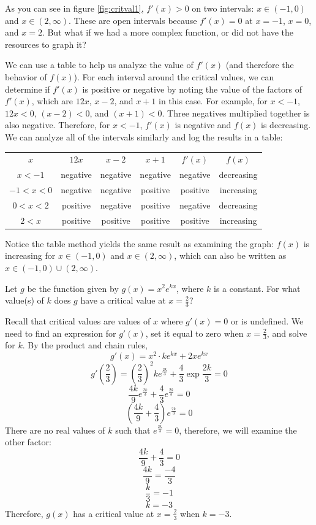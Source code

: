 \begin{Worked}
\begin{Solution}
As you can see in figure \ref{fig:critval1}, $f'(x)>0$ on two intervals: $x 
\in (-1, 0) $ and $x \in (2, \infty)$. These are open intervals because $f'(x) 
= 0$ at $x = -1$, $x = 0$, and $x = 2$. But what if we had a more complex 
function, or did not have the resources to graph it? 

We can use a table to help us analyze the value of $f'(x)$ (and therefore the behavior of $f(x)$). For 
each interval around the critical values, we can determine if $f'(x)$ is 
positive or negative by noting the value of the factors of $f'(x)$, which are 
$12x$, $x-2$, and $x+1$ in this case. For example, for $x < -1$, $12x < 0$, $(
x - 2) < 0$, and $(x + 1) < 0$. Three negatives multiplied together is also 
negative. Therefore, for $x<-1$, $f'(x)$ is negative and $f(x)$ is decreasing. 
We can analyze all of the intervals similarly and log the results in a table:


\begin{tabular}{c | c | c |c|c|c}
\hline
$x$ & $12x$ & $x-2$ & $x+1$ & $f'(x)$ & $f(x)$ \\
$x<-1$ & negative & negative & negative & negative &decreasing\\
$-1<x<0$ & negative & negative & positive & positive & increasing \\
$0<x<2$ & positive & negative & positive & negative & decreasing \\
$2<x$ & positive & positive & positive & positive & increasing\\
\end{tabular}


Notice the table method yields the same result as examining the graph: $f(x)$ 
is increasing for $x\in (-1, 0)$ and $x \in (2, \infty)$, which can also be 
written as $x \in (-1, 0) \cup (2, \infty)$. 
\end{Solution}
\end{Worked}


\begin{Exercise}[label=critval1]
	Let $g$ be the function given by $g(x) = x^2e^{kx}$, where $k$ is a constant. 
	For what value(s) of $k$ does $g$ have a critical value at $x=\frac{2}{3}$?
\end{Exercise}

\begin{Answer}[ref=critval1]
	Recall that critical values are values of $x$ where $g'(x) =0$ or is 
	undefined. We need to find an expression for $g'(x)$, set it equal to zero 
	when $x=\frac{2}{3}$, and solve for $k$. 
	By the product and chain rules,
	$$g'(x) = x^2 \cdot ke^{kx} + 2xe^{kx}$$
	$$g'(\frac{2}{3})=(\frac{2}{3})^2 ke^{\frac{2k}{3}}+\frac{4}{3}\exp{\frac{
	2k}{3}}=0$$
	$$\frac{4k}{9}e^{\frac{2k}{3}}+\frac{4}{3}e^{\frac{2k}{3}}=0$$
	$$(\frac{4k}{9}+\frac{4}{3})e^{\frac{2k}{3}}=0$$
	There are no real values of $k$ such that $e^{\frac{2k}{3}}=0$, therefore, we 
	will examine the other factor:
	$$\frac{4k}{9}+\frac{4}{3}=0$$
	$$\frac{4k}{9}=\frac{-4}{3}$$
	$$\frac{k}{3}=-1$$
	$$k=-3$$
	Therefore, $g(x)$ has a critical value at $x=\frac{2}{3}$ when $k=-3$.
\end{Answer}

